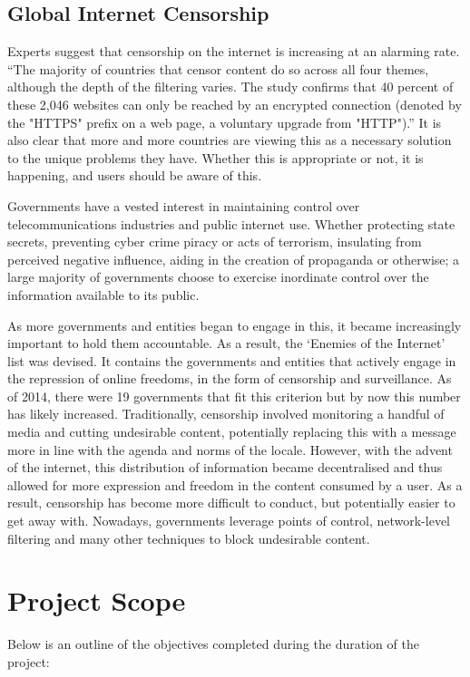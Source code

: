 \subsection{Global Internet Censorship}
Experts suggest that censorship on the internet is increasing at an alarming rate. “The majority of countries that censor content do so across all four themes, although the depth of the filtering varies. The study confirms that 40 percent of these 2,046 websites can only be reached by an 
encrypted connection (denoted by the "HTTPS" prefix on a web page, a voluntary upgrade from "HTTP").” \cite{Zittrain2017Censorship} It is also clear that more and more countries are viewing this as a necessary solution to the unique problems they have. Whether this is appropriate or not, it is happening, and users should be aware of this. 

Governments have a vested interest in maintaining control over telecommunications industries and public internet use. Whether protecting state secrets, preventing cyber crime piracy or acts of terrorism, insulating from perceived negative influence, aiding in the creation of propaganda or otherwise; a large majority of governments choose to exercise inordinate control over the 
information available to its public.  

As more governments and entities began to engage in this, it became increasingly important to hold them accountable. As a result, the ‘Enemies of the Internet’ list was devised. It contains the governments and entities that actively engage in the repression of online freedoms, in the form of censorship and surveillance. As of 2014, there were 19 governments that fit this criterion but by now this number has likely increased. \cite{RSFEnemiesInternet2014} Traditionally, censorship involved monitoring a handful of media and cutting undesirable content, potentially replacing this with a message more in line with the agenda and norms of the locale. However, with the advent of the internet, this distribution of information became decentralised and thus allowed for more expression and freedom in the content consumed by a user. As a result, censorship has become more difficult to conduct, but potentially easier to get away with. Nowadays, governments leverage points of control, network-level filtering and many other techniques to block undesirable content.

\section{Project Scope}
Below is an outline of the objectives completed during the duration of the project:

